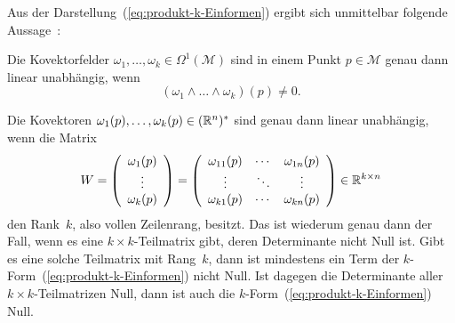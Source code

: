 Aus der Darstellung~(\ref{eq:produkt-k-Einformen}) ergibt sich unmittelbar
folgende Aussage~\cite[Theorem~{12.16}]{sastry1999}:
\begin{proposition}
\label{prop:Lineare-Unabh-Kovektoren-Keil}Die Kovektorfelder $\omega_{1},\ldots,\omega_{k}\in\Omega^{1}(\mathcal{M})$
sind in einem Punkt $p\in\mathcal{M}$ genau dann linear unabhängig,
wenn 
\begin{equation}
\left(\omega_{1}\wedge\ldots\wedge\omega_{k}\right)(p)\neq0.\label{eq:Lineare-Unabh-Kovektoren-Keil}
\end{equation}
\end{proposition}
\begin{svmultproof2}
Die Kovektoren $\omega_{1}(p),\ldots,\omega_{k}(p)\in({\mathbb{R}}^{n})^{*}$
sind genau dann linear unabhängig, wenn die Matrix 
\[
W=\left(\begin{array}{c}
\omega_{1}(p)\\
\vdots\\
\omega_{k}(p)
\end{array}\right)=\left(\begin{array}{ccc}
\omega_{11}(p) & \cdots & \omega_{1n}(p)\\
\vdots & \ddots & \vdots\\
\omega_{k1}(p) & \cdots & \omega_{kn}(p)
\end{array}\right)\in{\mathbb{R}}^{k\times n}
\]
den Rank~$k$, also vollen Zeilenrang, besitzt. Das ist wiederum
genau dann der Fall, wenn es eine $k\times k$-Teilmatrix gibt, deren
Determinante nicht Null ist. Gibt es eine solche Teilmatrix mit Rang~$k$,
dann ist mindestens ein Term der $k$-Form~(\ref{eq:produkt-k-Einformen})
nicht Null. Ist dagegen die Determinante aller $k\times k$-Teilmatrizen
Null, dann ist auch die $k$-Form~(\ref{eq:produkt-k-Einformen})
Null.
\end{svmultproof2}

\medskip{}

